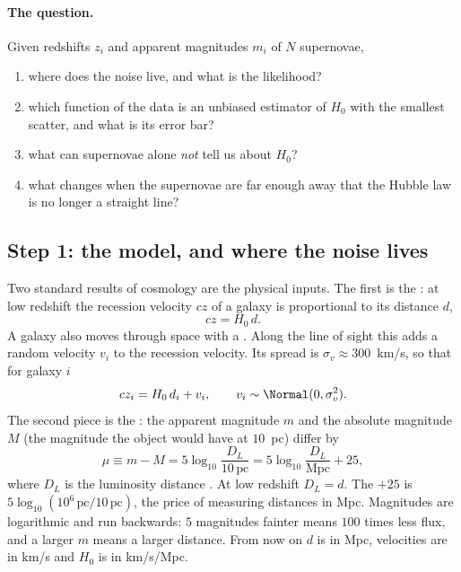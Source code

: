 \paragraph{The question.}
Given redshifts $z_i$ and apparent magnitudes $m_i$ of $N$ supernovae,
\begin{enumerate}
  \item where does the noise live, and what is the likelihood?
  \item which function of the data is an unbiased estimator of $H_0$ with the
        smallest scatter, and what is its error bar?
  \item what can supernovae alone \emph{not} tell us about $H_0$?
  \item what changes when the supernovae are far enough away that the Hubble
        law is no longer a straight line?
\end{enumerate}

\subsection{Step 1: the model, and where the noise lives}
\label{3b:sec:hubble-model}

Two standard results of cosmology are the physical inputs. The first is the
: at low redshift the
recession velocity $cz$ of a galaxy is proportional to its distance $d$,
\[
  cz=H_0\,d .
\]
A galaxy also moves through space with a 
. Along the line of sight this adds a random velocity
$v_i$ to the recession velocity. Its spread is $\sigma_v\approx300$~km/s, so
that for galaxy $i$
\begin{equation}
  cz_i=H_0\,d_i+v_i,\qquad v_i\sim\Normal(0,\sigma_v^2).
  \label{3b:eq:hubble-law}
\end{equation}
The second piece is the : the apparent magnitude
$m$ and the absolute magnitude $M$ (the magnitude the object would have at
$10$~pc) differ by
\[
  \mu\equiv m-M=5\log_{10}\frac{D_L}{10\,\text{pc}}
  =5\log_{10}\frac{D_L}{\text{Mpc}}+25 ,
\]
where $D_L$ is the luminosity distance . At low redshift $D_L=d$. The $+25$ is
$5\log_{10}(10^6\,\text{pc}/10\,\text{pc})$, the price of measuring distances
in Mpc. Magnitudes are logarithmic and run backwards: $5$ magnitudes fainter
means $100$ times less flux, and a larger $m$ means a larger distance. From
now on $d$ is in Mpc, velocities are in km/s and $H_0$ is in km/s/Mpc.

